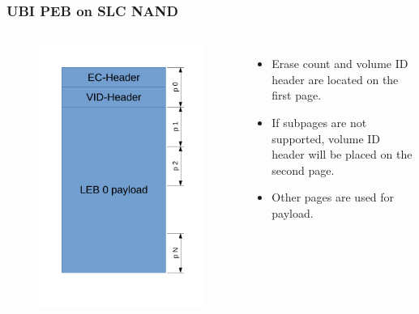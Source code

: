 \documentclass[aspectratio=169,obeyspaces,spaces,hyphens,dvipsnames]{beamer}
\begin{document}
\begin{frame}[fragile]
\frametitle{UBI PEB on SLC NAND}
   \begin{columns}
     \begin{figure}
     \includegraphics[scale=0.40]{ubi_slc.pdf}
     \end{figure}
    \begin{itemize}
    \item Erase count and volume ID header are located on the first page.
    \item If subpages are not supported, volume ID header will be placed on the second page.
    \item Other pages are used for payload.
    \end{itemize}
   \end{columns}
\end{frame}
\end{document}
